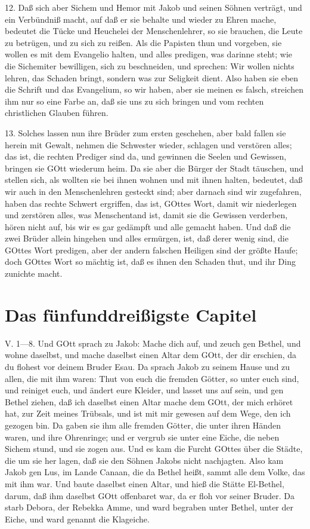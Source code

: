 12. Daß sich aber Sichem und Hemor mit Jakob und seinen Söhnen verträgt, und ein Verbündniß macht, auf daß er sie behalte und wieder zu Ehren mache, bedeutet die Tücke und Heuchelei der Menschenlehrer, so sie brauchen, die Leute zu betrügen, und zu sich zu reißen. Als die Papisten thun und vorgeben, sie wollen es mit dem Evangelio halten, und alles predigen, was darinne steht; wie die Sichemiter bewilligen, sich zu beschneiden, und sprechen: Wir wollen nichts lehren, das Schaden bringt, sondern was zur Seligkeit dient. Also haben sie eben die Schrift und das Evangelium, so wir haben, aber sie meinen es falsch, streichen ihm nur so eine Farbe an, daß sie uns zu sich bringen und vom rechten christlichen Glauben führen.

13. Solches lassen nun ihre Brüder zum ersten geschehen, aber bald fallen sie herein mit Gewalt, nehmen die Schwester wieder, schlagen und verstören alles; das ist, die rechten Prediger sind da, und gewinnen die Seelen und Gewissen, bringen sie GOtt wiederum heim. Da sie aber die Bürger der Stadt täuschen, und stellen sich, als wollten sie bei ihnen wohnen und mit ihnen halten, bedeutet, daß wir auch in den Menschenlehren gesteckt sind; aber darnach sind wir zugefahren, haben das rechte Schwert ergriffen, das ist, GOttes Wort, damit wir niederlegen und zerstören alles, was Menschentand ist, damit sie die Gewissen verderben, hören nicht auf, bis wir es gar gedämpft und alle gemacht haben. Und daß die zwei Brüder allein hingehen und alles ermürgen, ist, daß derer wenig sind, die GOttes Wort predigen, aber der andern falschen Heiligen sind der größte Haufe; doch GOttes Wort so mächtig ist, daß es ihnen den Schaden thut, und ihr Ding zunichte macht.

\section{Das fünfunddreißigste Capitel}
\begin{schriftzitat}
V. 1—8. Und GOtt sprach zu Jakob: Mache dich auf, und zeuch gen Bethel, und wohne daselbst, und mache daselbst einen Altar dem GOtt, der dir erschien, da du flohest vor deinem Bruder Esau. Da sprach Jakob zu seinem Hause und zu allen, die mit ihm waren: Thut von euch die fremden Götter, so unter euch sind, und reiniget euch, und ändert eure Kleider, und lasset uns auf sein, und gen Bethel ziehen, daß ich daselbst einen Altar mache dem GOtt, der mich erhöret hat, zur Zeit meines Trübsals, und ist mit mir gewesen auf dem Wege, den ich gezogen bin. Da gaben sie ihm alle fremden Götter, die unter ihren Händen waren, und ihre Ohrenringe; und er vergrub sie unter eine Eiche, die neben Sichem stund, und sie zogen aus. Und es kam die Furcht GOttes über die Städte, die um sie her lagen, daß sie den Söhnen Jakobs nicht nachjagten. Also kam Jakob
gen Lus, im Lande Canaan, die da Bethel heißt, sammt alle dem Volke, das mit ihm war. Und baute daselbst einen Altar, und hieß die Stätte El-Bethel, darum, daß ihm daselbst GOtt offenbaret war, da er floh vor seiner Bruder. Da starb Debora, der Rebekka Amme, und ward begraben unter Bethel, unter der Eiche, und ward genannt die Klageiche.
\end{schriftzitat}

